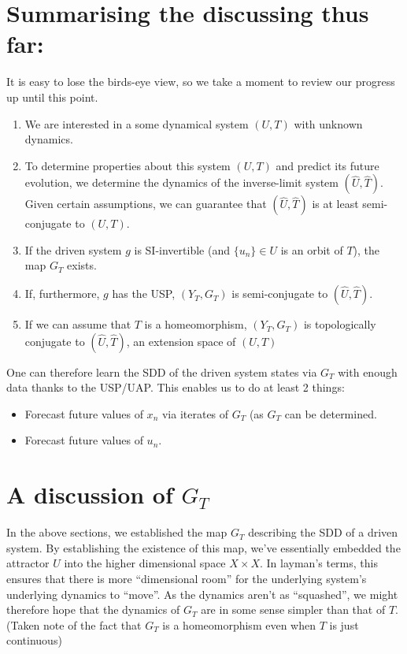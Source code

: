 \documentclass[a4paper,12pt,twoside]{book}
\begin{document}
\section*{Summarising the discussing thus far:}

It is easy to lose the birds-eye view, so we take a moment to review our progress up until this point.

\vspace{-8mm}
\begin{enumerate}
\item We are interested in a some dynamical system $(U,T)$ with unknown dynamics.
\item To determine properties about this system $(U,T)$ and predict its future evolution, we determine the dynamics of the inverse-limit system $(\widehat{U}, \widehat{T})$. Given certain assumptions, we can guarantee that $(\widehat{U}, \widehat{T})$ is at least semi-conjugate to $(U,T)$.
\item If the driven system $g$ is SI-invertible (and $\{u_n\}\in{U}$  is an orbit of $T$), the map $G_T$ exists. 
\item If, furthermore, $g$ has the USP, $(Y_T, G_T)$ is semi-conjugate to $(\widehat{U}, \widehat{T})$.
\item If we can assume that $T$ is a homeomorphism, $(Y_T, G_T)$ is topologically conjugate to $(\widehat{U}, \widehat{T})$, an extension space of $(U,T)$
\end{enumerate} 

One can therefore learn the SDD of the driven system states via $G_T$ with enough data thanks to the USP/UAP. This enables us to do at least 2 things: 
\vspace{-8mm}
\begin{itemize}[noitemsep]
\item Forecast future values of $x_n$ via iterates of $G_T$ (as $G_T$ can be determined.
\item Forecast future values of $u_n$. 
\end{itemize} 

\section{A discussion of $G_T$ }

In the above sections, we established the map $G_T$ describing the SDD of a driven system. By establishing the existence of this map, we’ve essentially embedded the attractor $U$  into the higher dimensional space $X\times{X}$. 
In layman’s terms, this ensures that there is more “dimensional room” for the underlying system’s underlying dynamics to “move”. As the dynamics aren’t as “squashed”, we might therefore hope that the dynamics of $G_T$ are in some sense simpler than that of $T$. (Taken note of the fact that $G_T$ is a homeomorphism even when $T$ is just continuous)
 
\end{document}
